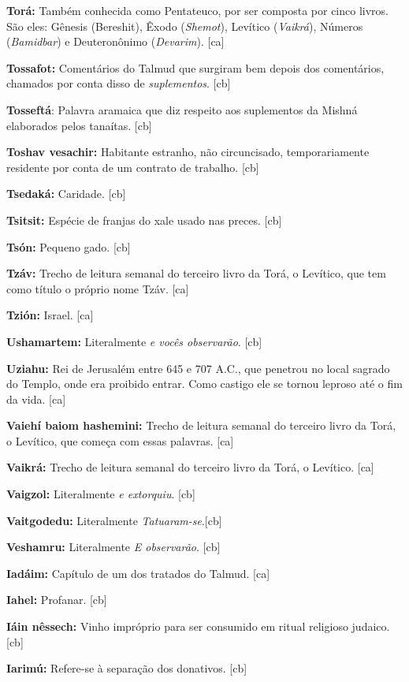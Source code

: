 \textbf{Torá:} Também conhecida como Pentateuco, por ser composta por 
cinco livros. São eles: Gênesis (Bereshit), Êxodo (\emph{Shemot}), 
Levítico (\emph{Vaikrá}), Números (\emph{Bamidbar}) e Deuteronônimo (\emph{Devarim}). [ca]

\textbf{Tossafot:} Comentários do Talmud que surgiram
bem depois dos comentários, chamados por conta disso de \emph{suplementos}. [cb]

\textbf{Tosseftá}: Palavra aramaica que diz respeito aos suplementos da Mishná
elaborados pelos tanaítas. [cb]

\textbf{Toshav vesachir:} Habitante estranho, não circuncisado, 
temporariamente residente por conta de um contrato de trabalho. [cb]

\textbf{Tsedaká:} Caridade. [cb]

\textbf{Tsitsit:} Espécie de franjas do xale usado nas preces. [cb]

\textbf{Tsón:} Pequeno gado. [cb]

\textbf{Tzáv:} Trecho de leitura semanal do terceiro livro da Torá, o
Levítico, que tem como título o próprio nome Tzáv. [ca]

\textbf{Tzión:} Israel. [ca]

\textbf{Ushamartem:} Literalmente \emph{e vocês observarão}. [cb]

\textbf{Uziahu:} Rei de Jerusalém entre 645 e 707 A.C., que penetrou no local
sagrado do Templo, onde era proibido entrar. Como castigo ele se tornou
leproso até o fim da vida. [ca]

\textbf{Vaiehí baiom hashemini:} Trecho de leitura semanal do terceiro livro da Torá, 
o Levítico, que começa com essas palavras. [ca]

\textbf{Vaikrá:} Trecho de leitura semanal do terceiro livro da Torá, o Levítico. [ca]

\textbf{Vaigzol:} Literalmente \emph{e extorquiu}. [cb]

\textbf{Vaitgodedu:} Literalmente \emph{Tatuaram-se}.[cb]

\textbf{Veshamru:} Literalmente \emph{E observarão}. [cb]

\textbf{Iadáim:} Capítulo de um dos tratados do Talmud. [ca]

\textbf{Iahel:} Profanar. [cb]

\textbf{Iáin nêssech:} Vinho impróprio para ser consumido em ritual religioso judaico. [cb]

\textbf{Iarimú:} Refere-se à separação dos donativos. [cb]

